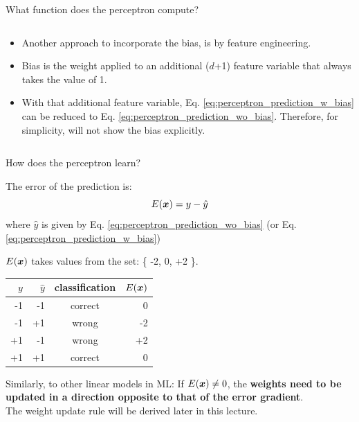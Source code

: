\begin{frame}[t]{What function does the perceptron compute?}
\begin{columns}
\begin{column}{0.50\textwidth}
\begin{itemize}
                \small
                \item Another approach to incorporate the bias, 
                is by \gls{feature engineering}.
                \item Bias is the weight applied to an additional ($d$+1) 
                feature variable that always takes the value of 1.
                \item With that additional feature variable, 
                Eq. \ref{eq:perceptron_prediction_w_bias}
                can be reduced to Eq. \ref{eq:perceptron_prediction_wo_bias}.
                Therefore, for simplicity, will not show the bias explicitly.
            \end{itemize}        
        \end{column}
      \end{columns}

\end{frame}

%
%
%

\begin{frame}[t]{How does the perceptron learn?}

    The error of the prediction is:
    \begin{equation}
        E(\boldsymbol{x}) = y - \hat{y}
        \label{eq:perceptron_prediction_error}
    \end{equation}        
    where $\hat{y}$ is given by Eq. \ref{eq:perceptron_prediction_wo_bias} 
    (or Eq. \ref{eq:perceptron_prediction_w_bias})\\
    \vspace{0.5cm}

    $E(\boldsymbol{x})$ takes values from the set: \{ -2, 0, +2 \}.\\
    \begin{center}
        \begin{tabular}{rrcr}
            \hline
            $y$  & $\hat{y}$ & classification & $E(\boldsymbol{x})$ \\
            \hline
            -1   & -1  &   correct &   0  \\
            -1   & +1  &   wrong   &  -2  \\
            +1   & -1  &   wrong   &  +2  \\
            +1   & +1  &   correct &   0  \\
            \hline
    \end{tabular}
    \end{center}

    Similarly, to other linear models in ML:
    If $E(\boldsymbol{x}) \ne 0$, the {\bf weights need to be updated in a 
    direction opposite to that of the error gradient}. \\
    \vspace{0.2cm}
    The weight update rule will be derived later in this lecture.

\end{frame}

